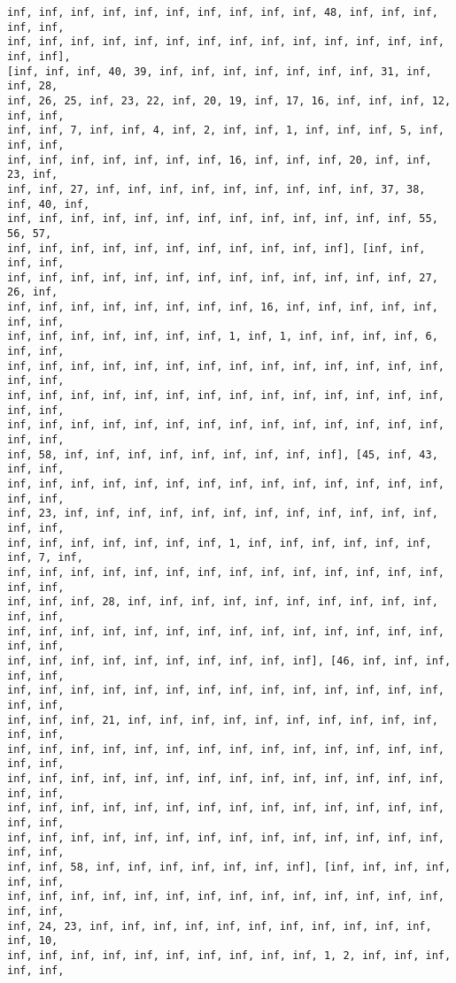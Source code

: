 \documentclass[11pt]{article}
\begin{document}
\begin{Verbatim}[commandchars=\\\{\}]
inf, inf, inf, inf, inf, inf, inf, inf, inf, inf, 48, inf, inf, inf, inf, inf,
inf, inf, inf, inf, inf, inf, inf, inf, inf, inf, inf, inf, inf, inf, inf, inf],
[inf, inf, inf, 40, 39, inf, inf, inf, inf, inf, inf, inf, 31, inf, inf, 28,
inf, 26, 25, inf, 23, 22, inf, 20, 19, inf, 17, 16, inf, inf, inf, 12, inf, inf,
inf, inf, 7, inf, inf, 4, inf, 2, inf, inf, 1, inf, inf, inf, 5, inf, inf, inf,
inf, inf, inf, inf, inf, inf, inf, 16, inf, inf, inf, 20, inf, inf, 23, inf,
inf, inf, 27, inf, inf, inf, inf, inf, inf, inf, inf, inf, 37, 38, inf, 40, inf,
inf, inf, inf, inf, inf, inf, inf, inf, inf, inf, inf, inf, inf, 55, 56, 57,
inf, inf, inf, inf, inf, inf, inf, inf, inf, inf, inf], [inf, inf, inf, inf,
inf, inf, inf, inf, inf, inf, inf, inf, inf, inf, inf, inf, inf, 27, 26, inf,
inf, inf, inf, inf, inf, inf, inf, inf, 16, inf, inf, inf, inf, inf, inf, inf,
inf, inf, inf, inf, inf, inf, inf, 1, inf, 1, inf, inf, inf, inf, 6, inf, inf,
inf, inf, inf, inf, inf, inf, inf, inf, inf, inf, inf, inf, inf, inf, inf, inf,
inf, inf, inf, inf, inf, inf, inf, inf, inf, inf, inf, inf, inf, inf, inf, inf,
inf, inf, inf, inf, inf, inf, inf, inf, inf, inf, inf, inf, inf, inf, inf, inf,
inf, 58, inf, inf, inf, inf, inf, inf, inf, inf, inf], [45, inf, 43, inf, inf,
inf, inf, inf, inf, inf, inf, inf, inf, inf, inf, inf, inf, inf, inf, inf, inf,
inf, 23, inf, inf, inf, inf, inf, inf, inf, inf, inf, inf, inf, inf, inf, inf,
inf, inf, inf, inf, inf, inf, inf, 1, inf, inf, inf, inf, inf, inf, inf, 7, inf,
inf, inf, inf, inf, inf, inf, inf, inf, inf, inf, inf, inf, inf, inf, inf, inf,
inf, inf, inf, 28, inf, inf, inf, inf, inf, inf, inf, inf, inf, inf, inf, inf,
inf, inf, inf, inf, inf, inf, inf, inf, inf, inf, inf, inf, inf, inf, inf, inf,
inf, inf, inf, inf, inf, inf, inf, inf, inf, inf], [46, inf, inf, inf, inf, inf,
inf, inf, inf, inf, inf, inf, inf, inf, inf, inf, inf, inf, inf, inf, inf, inf,
inf, inf, inf, 21, inf, inf, inf, inf, inf, inf, inf, inf, inf, inf, inf, inf,
inf, inf, inf, inf, inf, inf, inf, inf, inf, inf, inf, inf, inf, inf, inf, inf,
inf, inf, inf, inf, inf, inf, inf, inf, inf, inf, inf, inf, inf, inf, inf, inf,
inf, inf, inf, inf, inf, inf, inf, inf, inf, inf, inf, inf, inf, inf, inf, inf,
inf, inf, inf, inf, inf, inf, inf, inf, inf, inf, inf, inf, inf, inf, inf, inf,
inf, inf, 58, inf, inf, inf, inf, inf, inf, inf], [inf, inf, inf, inf, inf, inf,
inf, inf, inf, inf, inf, inf, inf, inf, inf, inf, inf, inf, inf, inf, inf, inf,
inf, 24, 23, inf, inf, inf, inf, inf, inf, inf, inf, inf, inf, inf, inf, 10,
inf, inf, inf, inf, inf, inf, inf, inf, inf, inf, 1, 2, inf, inf, inf, inf, inf,

\end{Verbatim}
\end{document}
